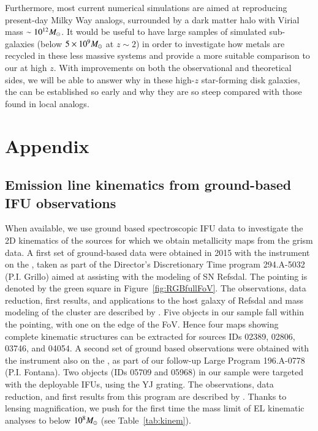 Furthermore, most current numerical simulations are aimed at reproducing present-day Milky
Way analogs, surrounded by a dark matter halo with Virial mass $\sim10^{12}M_\odot$. It would
be useful to have large samples of simulated sub-\Lstar galaxies (\Mstar below
$5\times10^9M_\odot$ at $z\sim2$) in order to investigate how metals are recycled in these less
massive systems and provide a more suitable comparison to our \mgms at high $z$.  With
improvements on both the observational and theoretical sides, we will be able to answer why
in these high-$z$ star-forming disk galaxies, the \mgs can be established so early and why
they are so steep compared with those found in local analogs.


\renewcommand{\thesection}{\thechapter.A}
\section{Appendix}

\renewcommand{\thesubsection}{\thechapter.A.\arabic{subsection}}
\subsection{Emission line kinematics from ground-based IFU observations}\label{sect:kinem}

When available, we use ground based spectroscopic IFU data
to investigate the 2D kinematics of the sources for which we obtain
metallicity maps from the \hst grism data.  A first
set of ground-based data were obtained in 2015 with the instrument
\muse on the \vlt, taken as part of the Director's Discretionary Time
program 294.A-5032 (P.I. Grillo) aimed at assisting
with the modeling of SN Refsdal.  The \muse pointing is denoted
by the green square in Figure~\ref{fig:RGBfullFoV}.  The observations,
data reduction, first results, and applications to the host galaxy of
Refsdal and mass modeling of the cluster are described by \citet{2016ApJ...822...78G,Karman:2016cg}.
Five objects in our \mg sample fall within the \muse pointing, with one on the edge of the FoV.
Hence four maps showing complete kinematic structures can be extracted for sources IDs 02389, 02806, 03746, and 04054.
A second set of ground based observations were obtained with the instrument \kmos also on the
\vlt, as part of our \glass follow-up \kmos Large Program 196.A-0778 (P.I. Fontana). Two objects (IDs 05709 and 05968) in our
sample were targeted with the deployable IFUs, using the YJ grating.
The observations, data reduction, and first results from this program are described by \citet{Mason:2016ww}.
Thanks to lensing magnification, we push for the first time the mass limit of EL kinematic analyses to below $10^8M_\odot$ (see Table~\ref{tab:kinem}).

